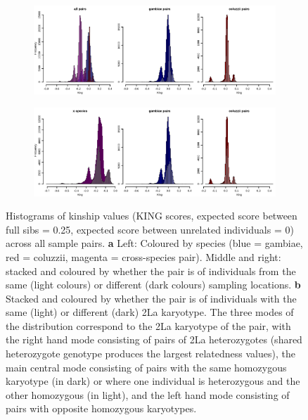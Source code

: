 \documentclass[a4paper,12pt]{article}
\begin{document}
\begin{figure}[h]
	\hspace*{-1cm}
	\begin{minipage}{\textwidth}
		\begin{subfigure}{\textwidth}
			\subcaption{}
			\includegraphics*[width = 7in]{../../NGSrelate/full_relatedness/king_histograms.png}
		\end{subfigure}\par
		\begin{subfigure}{\textwidth}
			\subcaption{}
			\includegraphics*[width = 7in]{../../NGSrelate/full_relatedness/king_histograms_karyotype.png}
		\end{subfigure}
	\end{minipage}
	\caption{\footnotesize Histograms of kinship values (KING scores, expected score between full sibs = 0.25, expected score between unrelated individuals = 0) across all sample pairs. \textbf{a} Left: Coloured by species (blue = gambiae, red = coluzzii, magenta = cross-species pair). Middle and right: stacked and coloured by whether the pair is of individuals from the same (light colours) or different (dark colours) sampling locations. \textbf{b} Stacked and coloured by whether the pair is of individuals with the same (light) or different (dark) 2La karyotype. The three modes of the distribution correspond to the 2La karyotype of the pair, with the right hand mode consisting of pairs of 2La heterozygotes (shared heterozygote genotype produces the largest relatedness values), the main central mode consisting of pairs with the same homozygous karyotype (in dark) or where one individual is heterozygous and the other homozygous (in light), and the left hand mode consisting of pairs with opposite homozygous karyotypes.}
	\label{FigM4}
\end{figure}
\end{document}
